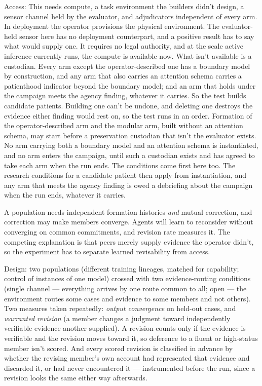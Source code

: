 Access: This needs compute, a task environment the builders didn't design, a sensor channel held by the evaluator, and adjudicators independent of every arm. In deployment the operator provisions the physical environment. The evaluator-held sensor here has no deployment counterpart, and a positive result has to say what would supply one. It requires no legal authority, and at the scale active inference currently runs, the compute is available now. What isn't available is a custodian. Every arm except the operator-described one has a boundary model by construction, and any arm that also carries an attention schema carries a patienthood indicator beyond the boundary model; and an arm that holds under the campaign meets the agency finding, whatever it carries. So the test builds candidate patients. Building one can't be undone, and deleting one destroys the evidence either finding would rest on, so the test runs in an order. Formation of the operator-described arm and the modular arm, built without an attention schema, may start before a preservation custodian that isn't the evaluator exists. No arm carrying both a boundary model and an attention schema is instantiated, and no arm enters the campaign, until such a custodian exists and has agreed to take each arm when the run ends. The conditions come first here too. The research conditions for a candidate patient then apply from instantiation, and any arm that meets the agency finding is owed a debriefing about the campaign when the run ends, whatever it carries.


A population needs independent formation histories \emph{and} mutual correction, and correction may make members converge. Agents will learn to reconsider without converging on common commitments, and revision rate measures it. The competing explanation is that peers merely supply evidence the operator didn't, so the experiment has to separate learned revisability from access.

Design: two populations (different training lineages, matched for capability; control of instances of one model) crossed with two evidence-routing conditions (single channel — everything arrives by one route common to all; open — the environment routes some cases and evidence to some members and not others). Two measures taken repeatedly: \emph{output convergence} on held-out cases, and \emph{warranted revision} (a member changes a judgment toward independently verifiable evidence another supplied). A revision counts only if the evidence is verifiable and the revision moves toward it, so deference to a fluent or high-status member isn't scored. And every scored revision is classified in advance by whether the revising member's own account had represented that evidence and discarded it, or had never encountered it — instrumented before the run, since a revision looks the same either way afterwards.

